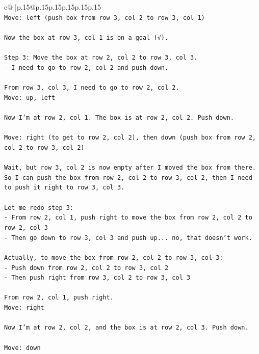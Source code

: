 \documentclass{article}
\begin{document}
{\begin{supertabular}{c@{$\;$}|p{.15\linewidth}@{}p{.15\linewidth}p{.15\linewidth}p{.15\linewidth}p{.15\linewidth}p{.15\linewidth}}
{{{\\ 
\texttt{Move: left (push box from row 3, col 2 to row 3, col 1)} \\
\\ 
\texttt{Now the box at row 3, col 1 is on a goal (√).} \\
\\ 
\texttt{Step 3: Move the box at row 2, col 2 to row 3, col 3.} \\
\texttt{{-} I need to go to row 2, col 2 and push down.} \\
\\ 
\texttt{From row 3, col 3, I need to go to row 2, col 2.} \\
\texttt{Move: up, left} \\
\\ 
\texttt{Now I'm at row 2, col 1. The box is at row 2, col 2. Push down.} \\
\\ 
\texttt{Move: right (to get to row 2, col 2), then down (push box from row 2, col 2 to row 3, col 2)} \\
\\ 
\texttt{Wait, but row 3, col 2 is now empty after I moved the box from there. So I can push the box from row 2, col 2 to row 3, col 2, then I need to push it right to row 3, col 3.} \\
\\ 
\texttt{Let me redo step 3:} \\
\texttt{{-} From row 2, col 1, push right to move the box from row 2, col 2 to row 2, col 3} \\
\texttt{{-} Then go down to row 3, col 3 and push up... no, that doesn't work.} \\
\\ 
\texttt{Actually, to move the box from row 2, col 2 to row 3, col 3:} \\
\texttt{{-} Push down from row 2, col 2 to row 3, col 2} \\
\texttt{{-} Then push right from row 3, col 2 to row 3, col 3} \\
\\ 
\texttt{From row 2, col 1, push right.} \\
\texttt{Move: right} \\
\\ 
\texttt{Now I'm at row 2, col 2, and the box is at row 2, col 3. Push down.} \\
\\ 
\texttt{Move: down} \\
\\ 
}}}
\end{supertabular}}
\end{document}
